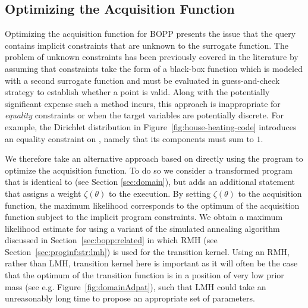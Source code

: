 
\subsection{Optimizing the Acquisition Function}
\label{sec:optacqfunc}

Optimizing the acquisition function for BOPP presents the issue that the query contains implicit constraints that are unknown to the surrogate function.  The problem of unknown constraints has been previously covered in the literature \citep{gardner2014bayesian,hernandez2015general} by assuming that constraints take the form of a black-box function which is modeled with a second surrogate function and must be evaluated in guess-and-check strategy to establish whether a point is valid. Along with the potentially significant expense such a method incurs, this approach is inappropriate for \emph{equality} constraints or when the target variables are potentially discrete.  For example, the Dirichlet distribution in Figure~\ref{fig:house-heating-code} introduces an equality constraint on , namely that its components must sum to $1$.

We therefore take an alternative approach based on directly using the program to optimize the acquisition function.  To do so we consider a transformed program  that is identical to  (see Section \ref{sec:domain}), but adds an additional \observe statement that assigns a weight $\zeta(\theta)$ to the execution.  By setting $\zeta(\theta)$ to the acquisition function, the maximum likelihood corresponds to the optimum of the acquisition function subject to the implicit program constraints.  %
We obtain a maximum likelihood estimate for  using a variant of the simulated annealing algorithm 
discussed in Section~\ref{sec:bopp:related} in which RMH (see Section~\ref{sec:proginf:str:lmh}) is used for
the transition kernel.  Using an RMH, rather than LMH, transition kernel here is important as it will often
be the case that the optimum of the transition function is in a position of very low prior mass (see e.g. Figure~\ref{fig:domainAdpat}),
such that LMH could take an unreasonably long time to propose an appropriate set of parameters.

